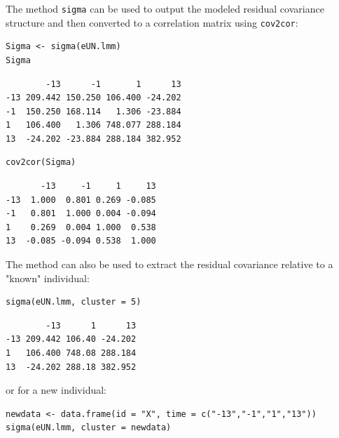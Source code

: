 \documentclass[12pt]{article}
\begin{document}
The method \texttt{sigma} can be used to output the modeled residual
covariance structure and then converted to a correlation matrix using
\texttt{cov2cor}:

\medskip

\begin{minipage}{0.45\linewidth}
\lstset{language=r,label= ,caption= ,captionpos=b,numbers=none}
\begin{lstlisting}
Sigma <- sigma(eUN.lmm)
Sigma
\end{lstlisting}

\begin{verbatim}
        -13      -1       1      13
-13 209.442 150.250 106.400 -24.202
-1  150.250 168.114   1.306 -23.884
1   106.400   1.306 748.077 288.184
13  -24.202 -23.884 288.184 382.952
\end{verbatim}

\end{minipage}
\begin{minipage}{0.05\linewidth}
\hphantom{x}
\end{minipage}
\begin{minipage}{0.45\linewidth}
\lstset{language=r,label= ,caption= ,captionpos=b,numbers=none}
\begin{lstlisting}
cov2cor(Sigma)
\end{lstlisting}

\begin{verbatim}
       -13     -1     1     13
-13  1.000  0.801 0.269 -0.085
-1   0.801  1.000 0.004 -0.094
1    0.269  0.004 1.000  0.538
13  -0.085 -0.094 0.538  1.000
\end{verbatim}

\end{minipage}

The method can also be used to extract the residual covariance
relative to a "known" individual:
\lstset{language=r,label= ,caption= ,captionpos=b,numbers=none}
\begin{lstlisting}
sigma(eUN.lmm, cluster = 5)
\end{lstlisting}

\begin{verbatim}
        -13      1      13
-13 209.442 106.40 -24.202
1   106.400 748.08 288.184
13  -24.202 288.18 382.952
\end{verbatim}


or for a new individual:
\lstset{language=r,label= ,caption= ,captionpos=b,numbers=none}
\begin{lstlisting}
newdata <- data.frame(id = "X", time = c("-13","-1","1","13"))
sigma(eUN.lmm, cluster = newdata)
\end{lstlisting}
\end{document}
